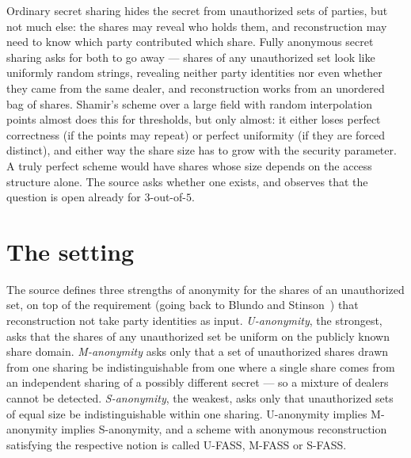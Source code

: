 \documentclass{aicr-conjecture}
\begin{document}

\vspace{0.4em}

\begin{informalconjecture}
Ordinary secret sharing hides the secret from unauthorized sets of
parties, but not much else: the shares may reveal who holds them, and
reconstruction may need to know which party contributed which share.
Fully anonymous secret sharing asks for both to go away --- shares of any
unauthorized set look like uniformly random strings, revealing neither
party identities nor even whether they came from the same dealer, and
reconstruction works from an unordered bag of shares. Shamir's scheme
over a large field with random interpolation points almost does this for
thresholds, but only almost: it either loses perfect correctness (if the
points may repeat) or perfect uniformity (if they are forced distinct),
and either way the share size has to grow with the security parameter. A
truly perfect scheme would have shares whose size depends on the access
structure alone. The source asks whether one exists, and observes that
the question is open already for $3$-out-of-$5$.
\end{informalconjecture}

\section{The setting}\label{sec:setting}

The source defines three strengths of anonymity for the shares of an
unauthorized set, on top of the requirement (going back to Blundo and
Stinson~\cite{BS97}) that reconstruction not take party identities as
input. \emph{U-anonymity}, the strongest, asks that the shares of any
unauthorized set be uniform on the publicly known share domain.
\emph{M-anonymity} asks only that a set of unauthorized shares drawn from
one sharing be indistinguishable from one where a single share comes from
an independent sharing of a possibly different secret --- so a mixture of
dealers cannot be detected. \emph{S-anonymity}, the weakest, asks only
that unauthorized sets of equal size be indistinguishable within one
sharing. U-anonymity implies M-anonymity implies S-anonymity, and a
scheme with anonymous reconstruction satisfying the respective notion is
called U-FASS, M-FASS or S-FASS\@.
\end{document}
